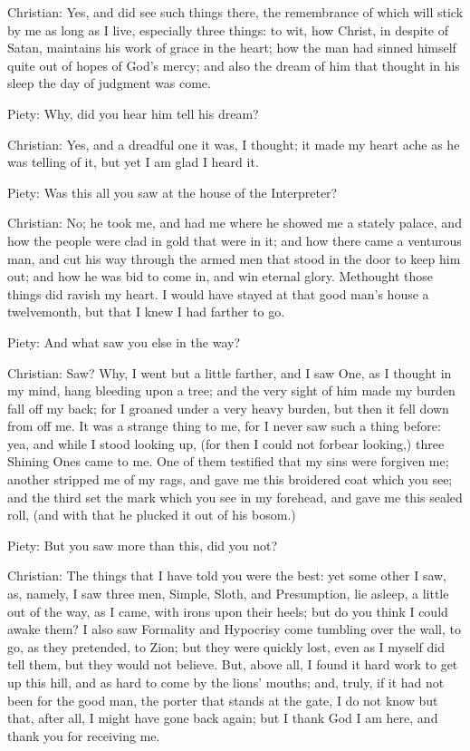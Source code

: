 Christian: Yes, and did see such things there, the remembrance of which will stick by me as long as I live, especially three things: to wit, how Christ, in despite of Satan, maintains his work of grace in the heart; how the man had sinned himself quite out of hopes of God's mercy; and also the dream of him that thought in his sleep the day of judgment was come.

Piety: Why, did you hear him tell his dream?

Christian: Yes, and a dreadful one it was, I thought; it made my heart ache as he was telling of it, but yet I am glad I heard it.

Piety: Was this all you saw at the house of the Interpreter?

Christian: No; he took me, and had me where he showed me a stately palace, and how the people were clad in gold that were in it; and how there came a venturous man, and cut his way through the armed men that stood in the door to keep him out; and how he was bid to come in, and win eternal glory. Methought those things did ravish my heart. I would have stayed at that good man's house a twelvemonth, but that I knew I had farther to go.

Piety: And what saw you else in the way?

Christian: Saw? Why, I went but a little farther, and I saw One, as I thought in my mind, hang bleeding upon a tree; and the very sight of him made my burden fall off my back; for I groaned under a very heavy burden, but then it fell down from off me. It was a strange thing to me, for I never saw such a thing before: yea, and while I stood looking up, (for then I could not forbear looking,) three Shining Ones came to me. One of them testified that my sins were forgiven me; another stripped me of my rags, and gave me this broidered coat which you see; and the third set the mark which you see in my forehead, and gave me this sealed roll, (and with that he plucked it out of his bosom.)

Piety: But you saw more than this, did you not?

Christian: The things that I have told you were the best: yet some other I saw, as, namely, I saw three men, Simple, Sloth, and Presumption, lie asleep, a little out of the way, as I came, with irons upon their heels; but do you think I could awake them? I also saw Formality and Hypocrisy come tumbling over the wall, to go, as they pretended, to Zion; but they were quickly lost, even as I myself did tell them, but they would not believe. But, above all, I found it hard work to get up this hill, and as hard to come by the lions' mouths; and, truly, if it had not been for the good man, the porter that stands at the gate, I do not know but that, after all, I might have gone back again; but I thank God I am here, and thank you for receiving me.

